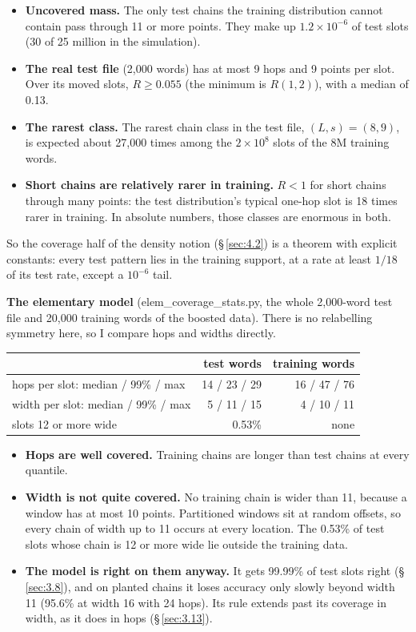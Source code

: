 \documentclass[paper=a4,fontsize=11pt,DIV=11,parskip=half,headings=small,numbers=noendperiod]{scrartcl}
\DeclareRobustCommand{\lead}[1]{\textsf{\bfseries\color{accent}#1}}
\DeclareRobustCommand{\code}[1]{{\fontseries{m}\ttfamily #1}}
\DeclareRobustCommand{\hdr}[1]{\textsf{\bfseries #1}}
\begin{document}
\begin{itemize}
\item \lead{Uncovered mass.} The only test chains the training distribution cannot contain pass through 11 or
  more points. They make up $1.2\times10^{-6}$ of test slots (30 of 25 million in the simulation).
\item \lead{The real test file} (2,000 words) has at most 9 hops and 9 points per slot. Over its moved slots,
  $R\ge0.055$ (the minimum is $R(1,2)$), with a median of 0.13.
\item \lead{The rarest class.} The rarest chain class in the test file, $(L,s)=(8,9)$, is expected about 27,000
  times among the $2\times10^8$ slots of the 8M training words.
\item \lead{Short chains are relatively rarer in training.} $R<1$ for short chains through many points: the test
  distribution’s typical one-hop slot is 18 times rarer in training. In absolute numbers, those classes are
  enormous in both.
\end{itemize}

So the coverage half of the density notion (\S\,\ref{sec:4.2}) is a theorem with explicit constants: every test
pattern lies in the training support, at a rate at least $1/18$ of its test rate, except a $10^{-6}$ tail.

\lead{The elementary model} (\code{elem\_\allowbreak{}coverage\_\allowbreak{}stats.\allowbreak{}py}, the whole
2,000-word test file and 20,000 training words of the boosted data). There is no relabelling symmetry here, so I
compare hops and widths directly.

\begin{center}\small
\begin{tabular}{@{}>{\raggedright\arraybackslash}p{6.4cm} r r@{}}
\toprule
\hdr{} & \hdr{test words} & \hdr{training words} \\
\midrule
hops per slot: median / 99\% / max & 14 / 23 / 29 & 16 / 47 / 76 \\
width per slot: median / 99\% / max & 5 / 11 / 15 & 4 / 10 / 11 \\
slots 12 or more wide & 0.53\% & none \\
\bottomrule
\end{tabular}
\end{center}

\begin{itemize}
\item \lead{Hops are well covered.} Training chains are longer than test chains at every quantile.
\item \lead{Width is not quite covered.} No training chain is wider than 11, because a window has at most 10
  points. Partitioned windows sit at random offsets, so every chain of width up to 11 occurs at every location.
  The 0.53\% of test slots whose chain is 12 or more wide lie outside the training data.
\item \lead{The model is right on them anyway.} It gets 99.99\% of test slots right (\S\,\ref{sec:3.8}), and on
  planted chains it loses accuracy only slowly beyond width 11 (95.6\% at width 16 with 24 hops). Its rule
  extends past its coverage in width, as it does in hops (\S\,\ref{sec:3.13}).
\end{itemize}
\end{document}

